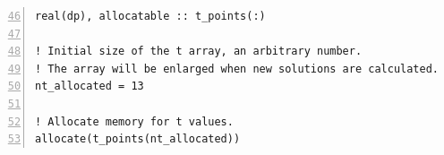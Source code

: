 \noindent\begin{minipage}{\linewidth}
\begin{lstlisting}[caption={Initializing a dynamical array for storing time values (\code{grid.f90}).}, frame=tlrb, numbers=left, firstnumber=46, label={code_initialize_t_array}]
real(dp), allocatable :: t_points(:)

! Initial size of the t array, an arbitrary number.
! The array will be enlarged when new solutions are calculated.
nt_allocated = 13

! Allocate memory for t values.
allocate(t_points(nt_allocated))
\end{lstlisting}
\end{minipage}







